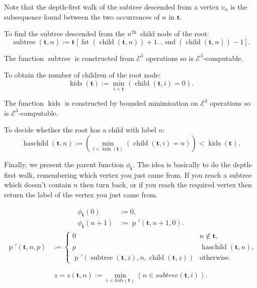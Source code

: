 \documentclass[a4paper]{article}
\newcommand{\grz}[1]{$\mathcal{E}^{#1}$}	%
\newcommand{\nth}{$n^{\textrm{th}}$~}	%
\newcommand{\tvec}{\mathbf{t}}	%
\newcommand{\recur}[1]{\begin{equation} \begin{split} #1 \end{split} \end{equation}}	%
\newcommand{\recurN}[1]{\begin{equation*} \begin{split} #1 \end{split} \end{equation*}}	%
\theoremstyle{plain}
\theoremstyle{definition}
\begin{document}
Note that the depth-first walk of the subtree descended from a vertex $v_n$ is the subsequence found between the two occurrences of $n$ in $\tvec$. 

To find the subtree descended from the \nth child node of the root:
\begin{equation} \operatorname{subtree}(\tvec,n) := \tvec[\operatorname{fst}(\operatorname{child}(\tvec,n))+1 \dots \operatorname{snd}(\operatorname{child}(\tvec,n))-1]. \end{equation}

The function $\operatorname{subtree}$ is constructed from \grz{3} operations so is \grz{3}-computable.

To obtain the number of children of the root node:
\begin{equation} \operatorname{kids}(\tvec) := \min_{i < \tvec} (\operatorname{child}(\tvec,i)=0). \end{equation}

The function $\operatorname{kids}$ is constructed by bounded minimisation on \grz{3} operations so is \grz{3}-computable.

To decide whether the root has a child with label $n$:
\begin{equation} \operatorname{haschild}(\tvec,n) :=  \left( \min_{i < \operatorname{kids}(\tvec)}({\operatorname{child}(\tvec,i)=n}) \right) < \operatorname{kids}(\tvec). \end{equation}


Finally, we present the parent function $\phi_{\tvec}$. The idea is basically to do the depth-first walk, remembering which vertex you just came from. If you reach a subtree which doesn't contain $n$ then turn back, or if you reach the required vertex then return the label of the vertex you just came from.

\recur{
\phi_{\tvec}(0) &:= 0, \\
\phi_{\tvec}(n+1) &:= \operatorname{p}'(\tvec,n+1,0).
}
\recurN{
\operatorname{p}'(\tvec,n,p) &:= \begin{cases}
						0 & n \not \in \tvec, \\
						p & \operatorname{haschild}(\tvec,n), \\
						\operatorname{p}'(\operatorname{subtree}(\tvec,z),n,\operatorname{child}(\tvec,z)) & \textrm{otherwise.}
					\end{cases}
}

\begin{equation*} z=z(\tvec,n) := \min_{i < kids(\tvec)}(n \in subtree(\tvec,i)). \end{equation*}
\end{document}
